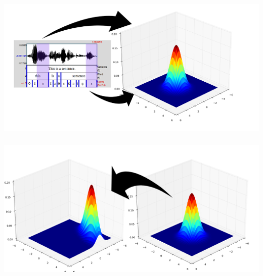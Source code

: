 \documentclass[pdflatex,compress]{beamer}
\begin{document}
\begin{frame}
  \frametitle{}
  \centering
  \begin{center}
    \includegraphics[width=\textwidth,height=0.8\textheight,keepaspectratio]{extraction.png}
  \end{center}
\end{frame}


\begin{frame}
  \frametitle{}
  \centering
  \begin{center}
    \includegraphics[width=\textwidth,height=0.8\textheight,keepaspectratio]{adaptation.png}
  \end{center}
\end{frame}
\end{document}
